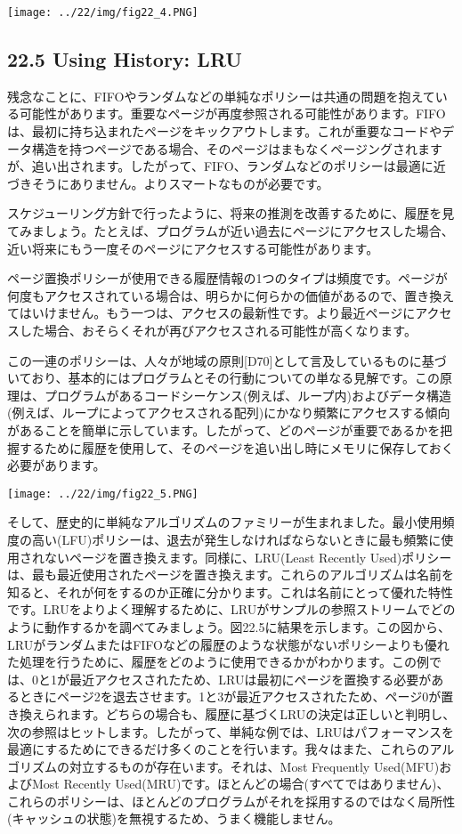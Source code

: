 \texttt{[image: ../22/img/fig22\_4.PNG]}

\hypertarget{using-history-lru}{%
\subsection*{22.5 Using History: LRU}\label{using-history-lru}}

残念なことに、FIFOやランダムなどの単純なポリシーは共通の問題を抱えている可能性があります。重要なページが再度参照される可能性があります。FIFOは、最初に持ち込まれたページをキックアウトします。これが重要なコードやデータ構造を持つページである場合、そのページはまもなくページングされますが、追い出されます。したがって、FIFO、ランダムなどのポリシーは最適に近づきそうにありません。よりスマートなものが必要です。

スケジューリング方針で行ったように、将来の推測を改善するために、履歴を見てみましょう。たとえば、プログラムが近い過去にページにアクセスした場合、近い将来にもう一度そのページにアクセスする可能性があります。

ページ置換ポリシーが使用できる履歴情報の1つのタイプは頻度です。ページが何度もアクセスされている場合は、明らかに何らかの価値があるので、置き換えてはいけません。もう一つは、アクセスの最新性です。より最近ページにアクセスした場合、おそらくそれが再びアクセスされる可能性が高くなります。

この一連のポリシーは、人々が地域の原則{[}D70{]}として言及しているものに基づいており、基本的にはプログラムとその行動についての単なる見解です。この原理は、プログラムがあるコードシーケンス(例えば、ループ内)およびデータ構造(例えば、ループによってアクセスされる配列)にかなり頻繁にアクセスする傾向があることを簡単に示しています。したがって、どのページが重要であるかを把握するために履歴を使用して、そのページを追い出し時にメモリに保存しておく必要があります。

\texttt{[image: ../22/img/fig22\_5.PNG]}

そして、歴史的に単純なアルゴリズムのファミリーが生まれました。最小使用頻度の高い(LFU)ポリシーは、退去が発生しなければならないときに最も頻繁に使用されないページを置き換えます。同様に、LRU(Least
Recently
Used)ポリシーは、最も最近使用されたページを置き換えます。これらのアルゴリズムは名前を知ると、それが何をするのか正確に分かります。これは名前にとって優れた特性です。LRUをよりよく理解するために、LRUがサンプルの参照ストリームでどのように動作するかを調べてみましょう。図22.5に結果を示します。この図から、LRUがランダムまたはFIFOなどの履歴のような状態がないポリシーよりも優れた処理を行うために、履歴をどのように使用できるかがわかります。この例では、0と1が最近アクセスされたため、LRUは最初にページを置換する必要があるときにページ2を退去させます。1と3が最近アクセスされたため、ページ0が置き換えられます。どちらの場合も、履歴に基づくLRUの決定は正しいと判明し、次の参照はヒットします。したがって、単純な例では、LRUはパフォーマンスを最適にするためにできるだけ多くのことを行います。我々はまた、これらのアルゴリズムの対立するものが存在います。それは、Most
Frequently Used(MFU)およびMost Recently
Used(MRU)です。ほとんどの場合(すべてではありません)、これらのポリシーは、ほとんどのプログラムがそれを採用するのではなく局所性(キャッシュの状態)を無視するため、うまく機能しません。

